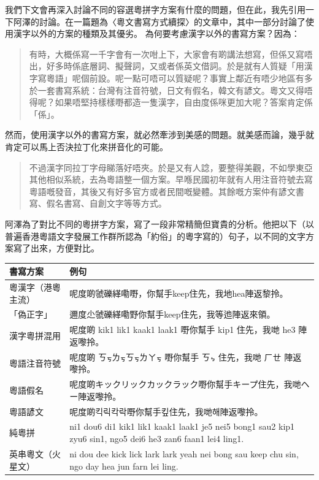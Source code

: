 \documentclass[a5paper, 12pt, openany]{book} %
\begin{document}
我們下文會再深入討論不同的容選粵拼字方案有什麼的問題，但在此，我先引用一下阿澤的討論。在一篇題為〈粵文書寫方式續探〉的文章中，其中一部分討論了使用漢字以外的方案的種類及其優劣。 為何要考慮漢字以外的書寫方案？因為：
\begin{quotation}
有時，大概係寫一千字會有一次咁上下，大家會有啲講法想寫，但係又寫唔出，好多時係底層詞、擬聲詞，又或者係英文借詞。於是就有人質疑「用漢字寫粵語」呢個前設。呢一點可唔可以質疑呢？事實上鄰近有唔少地區有多於一套書寫系統：台灣有注音符號，日文有假名，韓文有諺文。粵文又得唔得呢？如果唔堅持樣樣嘢都造一隻漢字，自由度係咪更加大呢？答案肯定係「係」。

\end{quotation}

然而，使用漢字以外的書寫方案，就必然牽涉到美感的問題。就美感而論，幾乎就肯定可以馬上否決拉丁化來拼音化的可能。

\begin{quotation}
不過漢字同拉丁字母睇落好唔夾。於是又有人諗，要整得美觀，不如學東亞其他相似系統，去為粵語整一個方案。早喺民國初年就有人用注音符號去寫粵語嘅發音，其後又有好多官方或者民間嘅變體。其餘嘅方案仲有諺文書寫、假名書寫、自創文字等等方式。 

\end{quotation}

阿澤為了對比不同的粵拼字方案，寫了一段非常精簡但寶貴的分析。他把以下（以普遍香港粵語文字發展工作群所認為「約俗」的粵字寫的）句子，以不同的文字方案寫了出來，方便對比。



\begin{longtable}{|l|p{7cm}|}
\hline
\textbf{書寫方案} & \textbf{例句} \\
\hline
\jcz{}
\batang{}
粵漢字（港粵主流） & 呢度啲虢礫緙嘞嘢，你幫手keep住先，我地hea陣返黎拎。 \\
\hline
「偽正字」 & 邇度尐虢礫緙嘞野你幫手keep住先，我等迆陣返來領。 \\
\hline
漢字粵拼混用 & 呢度啲 kik1 lik1 kaak1 laak1 嘢你幫手 kip1 住先，我哋 he3 陣返嚟拎。 \\
\hline
粵語注音符號 & 呢度啲 ㄎㆶㄌㆶㄎㆶㄌㄚㆶ 嘢你幫手 ㄎㆴ 住先，我哋 ㄏㄝ 陣返嚟拎。 \\
\hline
粵語假名 & 呢度啲キックリックカックラック嘢你幫手キープ住先，我哋ヘー陣返嚟拎。 \\
\hline
粵語諺文 & 呢度啲{\koreanfont 킥릭칵락}嘢你幫手{\koreanfont 킾}住先，我哋{\koreanfont 해}陣返嚟拎。 \\
\hline
純粵拼 & ni1 dou6 di1 kik1 lik1 kaak1 laak1 je5 nei5 bong1 sau2 kip1 zyu6 sin1, ngo5 dei6 he3 zan6 faan1 lei4 ling1. \\
\hline
英串粵文（火星文） & ni dou dee kick lick lark lark yeah nei bong sau keep chu sin, ngo day hea jun farn lei ling. \\
\hline
\end{longtable}
\end{document}
